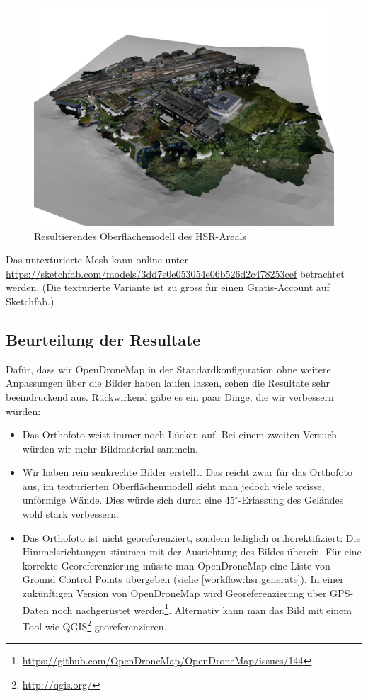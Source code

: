 \begin{figure}[H]
	\centering
	\includegraphics[width=\textwidth]{images/odm_mesh}
	\caption{Resultierendes Oberflächemodell des HSR-Areals}
	\label{img:odm_mesh}
\end{figure}

\noindent Das untexturierte Mesh kann online unter
\url{https://sketchfab.com/models/3dd7e0e053054e06b526d2c478253cef} betrachtet
werden. (Die texturierte Variante ist zu gross für einen Gratis-Account auf
Sketchfab.)

\subsection{Beurteilung der Resultate}

Dafür, dass wir OpenDroneMap in der Standardkonfiguration ohne weitere
Anpassungen über die Bilder haben laufen lassen, sehen die Resultate sehr
beeindruckend aus. Rückwirkend gäbe es ein paar Dinge, die wir verbessern
würden:

\begin{itemize}
	\item Das Orthofoto weist immer noch Lücken auf. Bei einem zweiten Versuch
		würden wir mehr Bildmaterial sammeln.
	\item Wir haben rein senkrechte Bilder erstellt. Das reicht zwar für das
		Orthofoto aus, im texturierten Oberflächenmodell sieht man jedoch viele
		weisse, unförmige Wände. Dies würde sich durch eine 45$^{\circ}$-Erfassung des
		Geländes wohl stark verbessern.
	\item Das Orthofoto ist nicht georeferenziert, sondern lediglich
		orthorektifiziert: Die Himmelsrichtungen stimmen mit der Ausrichtung des
		Bildes überein. Für eine korrekte Georeferenzierung müsste man OpenDroneMap
		eine Liste von Ground Control Points übergeben (siehe
		\autoref{workflow:hsr:generate}). In einer zukünftigen Version von
		OpenDroneMap wird Georeferenzierung über GPS-Daten noch nachgerüstet
		werden\footnote{\url{https://github.com/OpenDroneMap/OpenDroneMap/issues/144}}.
		Alternativ kann man das Bild mit einem Tool wie
		QGIS\footnote{\url{http://qgis.org/}} georeferenzieren.
\end{itemize}

